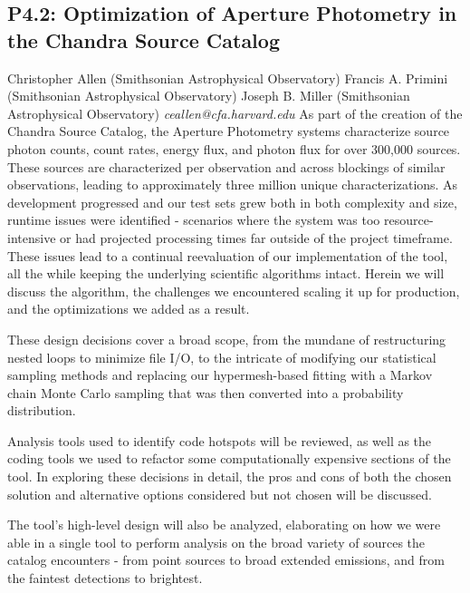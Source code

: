 \documentclass{report}
\begin{document}
\subsection*{P4.2: Optimization of Aperture Photometry in the Chandra Source Catalog}
\bigskip
Christopher Allen (Smithsonian Astrophysical Observatory) \newline Francis A. Primini (Smithsonian Astrophysical Observatory) \newline  Joseph B. Miller (Smithsonian Astrophysical Observatory)\newline   \newline  \newline  \newline\newline
{\it ceallen@cfa.harvard.edu}\newline
\newline\newline
As part of the creation of the Chandra Source Catalog, the Aperture Photometry systems characterize source photon counts, count rates, energy flux, and photon flux for over 300,000 sources.  These sources are characterized per observation and across blockings of similar observations, leading to approximately three million unique characterizations. As development progressed and our test sets grew both in both complexity and size, runtime issues were identified - scenarios where the system was too resource-intensive or had projected processing times far outside of the project timeframe.  These issues lead to a continual reevaluation of our implementation of the tool, all the while keeping the underlying scientific algorithms intact. Herein we will discuss the algorithm, the challenges we encountered scaling it up for production, and the optimizations we added as a result.
 
These design decisions cover a broad scope, from the mundane of restructuring nested loops to minimize file I/O, to the intricate of modifying our statistical sampling methods and replacing our hypermesh-based fitting with a Markov chain Monte Carlo sampling that was then converted into a probability distribution. 
 
Analysis tools used to identify code hotspots will be reviewed, as well as the coding tools we used to refactor some computationally expensive sections of the tool. In exploring these decisions in detail, the pros and cons of both the chosen solution and alternative options considered but not chosen will be discussed.
 
The tool’s high-level design will also be analyzed, elaborating on how we were able in a single tool to perform analysis on the broad variety of sources the catalog encounters - from point sources to broad extended emissions, and from the faintest detections to brightest.\newline
\newpage
\end{document}
